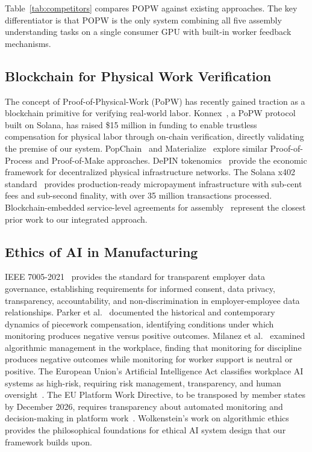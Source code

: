 \documentclass[10pt,twocolumn]{article}
\newcommand{\popw}{POPW}
\begin{document}
Table~\ref{tab:competitors} compares \popw{} against existing approaches. The key differentiator is that \popw{} is the only system combining all five assembly understanding tasks on a single consumer GPU with built-in worker feedback mechanisms.

\subsection{Blockchain for Physical Work Verification}

The concept of Proof-of-Physical-Work (PoPW) has recently gained traction as a blockchain primitive for verifying real-world labor. Konnex~\cite{konnex2026popw}, a PoPW protocol built on Solana, has raised \$15 million in funding to enable trustless compensation for physical labor through on-chain verification, directly validating the premise of our system. PopChain~\cite{popchain} and Materialize~\cite{materialize} explore similar Proof-of-Process and Proof-of-Make approaches. DePIN tokenomics~\cite{depin2025} provide the economic framework for decentralized physical infrastructure networks. The Solana x402 standard~\cite{solana2024x402} provides production-ready micropayment infrastructure with sub-cent fees and sub-second finality, with over 35 million transactions processed. Blockchain-embedded service-level agreements for assembly~\cite{blockchain-sla2026} represent the closest prior work to our integrated approach.

\subsection{Ethics of AI in Manufacturing}

IEEE 7005-2021~\cite{IEEE7005} provides the standard for transparent employer data governance, establishing requirements for informed consent, data privacy, transparency, accountability, and non-discrimination in employer-employee data relationships. Parker et al.~\cite{parker2017piecework} documented the historical and contemporary dynamics of piecework compensation, identifying conditions under which monitoring produces negative versus positive outcomes. Milanez et al.~\cite{milanez2025algorithmic} examined algorithmic management in the workplace, finding that monitoring for discipline produces negative outcomes while monitoring for worker support is neutral or positive. The European Union's Artificial Intelligence Act classifies workplace AI systems as high-risk, requiring risk management, transparency, and human oversight~\cite{euai2024}. The EU Platform Work Directive, to be transposed by member states by December 2026, requires transparency about automated monitoring and decision-making in platform work~\cite{euplatform2024}. Wolkenstein's work on algorithmic ethics~\cite{wolkenstein2024healthy} provides the philosophical foundations for ethical AI system design that our framework builds upon.
\end{document}
